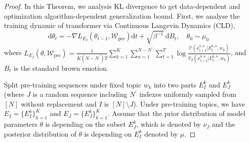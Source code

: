 \begin{proof}
	In this Theorem, we analysis KL divergence to get data-dependent and optimization algorithm-dependent generalization bound. First, we analyse the training dynamic of transformer via Continuous Langevin Dynamics (CLD),
	$$
	\mathrm{d} \theta_t=-\nabla L_{E_I}(\theta_{t-1}, \mathcal{W}_{\text{pre}})\mathrm{d} t+\sqrt{\beta^{-1}} \mathrm{~d} B_t, \quad \theta_0 \sim \mu_0
	$$
	where $L_{E_I}(\theta, \mathcal{W}_{\text{pre}})=\frac{1}{K(N-N^{\prime})T}\sum_{k=1}^K\sum_{n=1}^{N-N^{\prime}}\sum_{t=1}^T \log \frac{\mathbb{P}(x^{k,n}_{t+1}|E^{k,n}_t, w_k)}{\mathbb{P}_\theta(x^{k,n}_{t+1}|E^{k,n}_t, w_k)}$, and $B_t$ is the standard brown emotion.
	
	Split pre-training sequences under fixed topic $w_k$ into two parts $E^k_I$ and $E^k_J$ (where $J$ is a random sequence including $N^{\prime}$ indexes uniformly sampled from $[N]$ without replacement and $I$ is $[N]\setminus J$). Under pre-training topics, we have $E_I=\{E^k_I\}_{k=1}^K$ and $E_J=\{E^k_J\}_{k=1}^K$. Assume that the prior distribution of model parameters $\theta$ is depending on the subset $E^k_J$, which is denoted by $\nu_J$ and the posterior distribution of $\theta$ is depending on $E^k_I$ denoted by $\mu$.
	

\end{proof}
